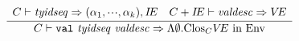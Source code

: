 



\begin{equation}        %
\label{valspec-rule}
\frac{\begin{array}{lr} 
       \C\ts\tyidseq\ra(\alpha_1,\cdots,\alpha_k),{\IE} &
       \plusmap{\C}{\IE}\ts\valdesc\ra\VE 
       \end{array}}
     { \C\ts\valspec\ra\LAMBDA{\emptyset}{\cl{\C}{\VE}\ \In\ \Env }} %
\end{equation}


